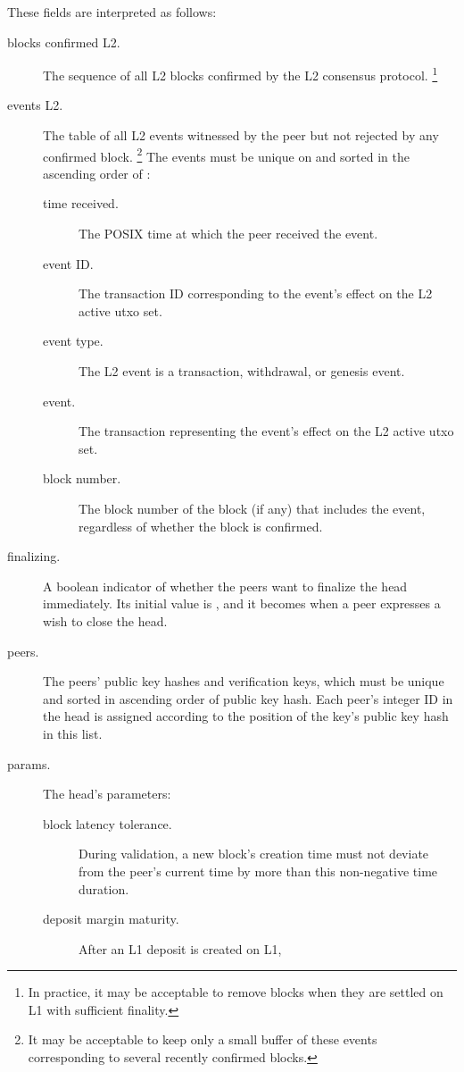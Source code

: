 \documentclass[../hydrozoa.tex]{subfiles}
\begin{document}
These fields are interpreted as follows:
\begin{description}
  \item[blocks confirmed L2.] The sequence of all L2 blocks confirmed by the L2 consensus protocol.%
    \footnote{In practice, it may be acceptable to remove blocks when they are settled on L1 with sufficient finality.}
  \item[events L2.] The table of all L2 events witnessed by the peer but not rejected by any confirmed block.%
    \footnote{It may be acceptable to keep only a small buffer of these events corresponding to several recently confirmed blocks.}
    The events must be unique on  and sorted in the ascending order of :
    \begin{description}
      \item[time received.] The POSIX time at which the peer received the event.
      \item[event ID.] The transaction ID corresponding to the event's effect on the L2 active utxo set.
      \item[event type.] The L2 event is a transaction, withdrawal, or genesis event.
      \item[event.] The transaction representing the event's effect on the L2 active utxo set.
      \item[block number.] The block number of the block (if any) that includes the event, regardless of whether the block is confirmed.
    \end{description}
  \item[finalizing.] A boolean indicator of whether the peers want to finalize the head immediately.
    Its initial value is , and it becomes  when a peer expresses a wish to close the head.
  \item[peers.] The peers' public key hashes and verification keys, which must be unique and sorted in ascending order of public key hash.
    Each peer's integer ID in the head is assigned according to the position of the key's public key hash in this list.
  \item[params.] The head's parameters:
    \begin{description}
      \item[block latency tolerance.] During validation, a new block's creation time must not deviate from the peer's current time by more than this non-negative time duration.
      \item[deposit margin maturity.] After an L1 deposit is created on L1,%

\end{description}
\end{description}
\end{document}
